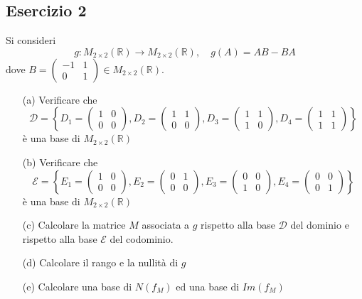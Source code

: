 \documentclass[a4paper]{article}
\theoremstyle{break}
\theoremstyle{break}
\theoremstyle{break}
\theoremstyle{break}
\begin{document}
\subsection{Esercizio 2}
Si consideri
\[
	g: M_{2 \times 2}(\mathbb{R}) \to M_{2 \times 2}(\mathbb{R}), \quad g(A) = AB - BA
\]
dove \( B = \begin{pmatrix}
	-1 & 1 \\
	0  & 1
\end{pmatrix} \in M_{2 \times 2}(\mathbb{R}) \).

\begin{enumerate}
	\item[(a)] Verificare che
	      \[
		      \mathcal{D} = \left\{
		      D_1 = \begin{pmatrix}
			      1 & 0 \\
			      0 & 0
		      \end{pmatrix} ,
		      D_2 = \begin{pmatrix}
			      1 & 1 \\
			      0 & 0
		      \end{pmatrix} ,
		      D_3 = \begin{pmatrix}
			      1 & 1 \\
			      1 & 0
		      \end{pmatrix} ,
		      D_4 = \begin{pmatrix}
			      1 & 1 \\
			      1 & 1
		      \end{pmatrix}
		      \right\}
	      \]
	      è una base di \( M_{2 \times 2}(\mathbb{R}) \)

	\item[(b)] Verificare che
	      \[
		      \mathcal{E} = \left\{
		      E_1 = \begin{pmatrix}
			      1 & 0 \\
			      0 & 0
		      \end{pmatrix} ,
		      E_2 = \begin{pmatrix}
			      0 & 1 \\
			      0 & 0
		      \end{pmatrix} ,
		      E_3 = \begin{pmatrix}
			      0 & 0 \\
			      1 & 0
		      \end{pmatrix} ,
		      E_4 = \begin{pmatrix}
			      0 & 0 \\
			      0 & 1
		      \end{pmatrix}
		      \right\}
	      \]
	      è una base di \( M_{2 \times 2}(\mathbb{R}) \)

	\item[(c)] Calcolare la matrice \( M \) associata a \( g \) rispetto alla base \( \mathcal{D} \)
	      del dominio e rispetto alla base \( \mathcal{E} \) del codominio.

	\item[(d)] Calcolare il rango e la nullità di \( g \)

	\item[(e)] Calcolare una base di \( N(f_M) \) ed una base di \( Im(f_M) \)
\end{enumerate}
\end{document}
